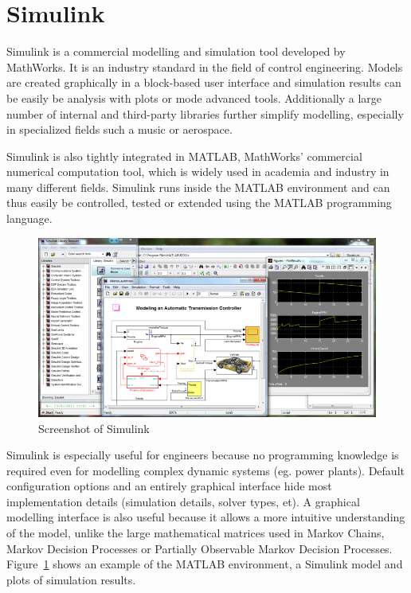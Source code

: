 \section{Simulink}
\label{sec:simulink}

Simulink is a commercial modelling and simulation tool developed by MathWorks. It is an industry standard in the field of control engineering. Models are created graphically in a block-based user interface and simulation results can be easily be analysis with plots or mode advanced tools. Additionally a large number of internal and third-party libraries further simplify modelling, especially in specialized fields such a music or aerospace.

Simulink is also tightly integrated in MATLAB, MathWorks' commercial numerical computation tool, which is widely used in academia and industry in many different fields. Simulink runs inside the MATLAB environment and can thus easily be controlled, tested or extended using the MATLAB programming language.

\begin{figure}[simulink_screenshot]
\begin{center}
\includegraphics[width=15cm]{media/simulink_screenshot.png}
\caption{Screenshot of Simulink}
\label{simulink_screenshot}
\end{center}
\end{figure}

Simulink is especially useful for engineers because no programming knowledge is required even for modelling complex dynamic systems (eg. power plants). Default configuration options and an entirely graphical interface hide most implementation details (simulation details, solver types, et). A graphical modelling interface is also useful because it allows a more intuitive understanding of the model, unlike the large mathematical matrices used in Markov Chains, Markov Decision Processes or Partially Observable Markov Decision Processes. Figure~\ref{simulink_screenshot} shows an example of the MATLAB environment, a Simulink model and plots of simulation results.

